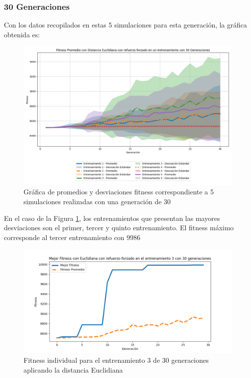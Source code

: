 \documentclass[conference]{IEEEtran}
\begin{document}
\subsubsection{30 Generaciones} Con los datos recopilados en estas 5 simulaciones para esta generación, la gráfica obtenida es:
\begin{figure}[H]
    \centering    \includegraphics[width=0.99 \linewidth]{Euclidiana/Fitness_Acumulado_Eucli_30Gen.png}
    \caption{Gráfica de promedios y desviaciones fitness correspondiente a 5 simulaciones realizadas con una generación de 30}
    \label{fig:Euclidiana_30_refuerzo}
\end{figure}
En el caso de la Figura \ref{fig:Euclidiana_30_refuerzo}, los entrenamientos que presentan las mayores desviaciones son el primer, tercer y quinto entrenamiento. El fitness máximo corresponde al tercer entrenamiento con 9986
\begin{figure}[H]
    \centering
    \includegraphics[width=0.9\linewidth]{Euclidiana/Fitness_individual_30/Fitness_3_Eucli_30Gen.png}
    \caption{Fitness individual para el entrenamiento 3 de 30 generaciones aplicando la distancia Euclidiana}
    \label{fig:Fitnes_ecu_3_30_inv}
\end{figure}
\end{document}
